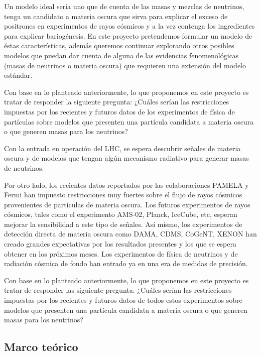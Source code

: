 Un modelo ideal sería uno que de cuenta de las masas y mezclas de
neutrinos, tenga un candidato a materia oscura que sirva para explicar
el exceso de positrones en experimentos de rayos cósmicos y a la vez
contenga los ingredientes para explicar bariogénesis.  En este
proyecto pretendemos formular un modelo de éstas características,
además queremos continuar explorando otros posibles modelos que puedan
dar cuenta de alguna de las evidencias fenomenológicas (masas de
neutrinos o materia oscura) que requieren una extensión del modelo
estándar.


\begin{proyecto}
  Con base en lo planteado anteriormente, lo que proponemos en este
  proyecto es tratar de responder la siguiente pregunta: ¿Cuáles
  serían las restricciones impuestas por los recientes y futuros datos
  de los experimentos de física de partículas sobre modelos que
  presenten una partícula candidata a materia oscura o que generen
  masas para los neutrinos?
\end{proyecto}
 
\begin{ideas}
  
Con la entrada en operación del LHC, se espera descubrir señales de materia oscura y de modelos que tengan algún mecanismo radiativo para generar masas de neutrinos.

Por otro lado, los recientes datos reportados por las colaboraciones PAMELA y Fermi han impuesto restricciones muy fuertes sobre el flujo de rayos cósmicos provenientes de partículas de materia oscura. Los futuros experimentos de rayos cósmicos, tales como el experimento AMS-02, Planck, IceCube, etc, esperan mejorar la sensibilidad a este tipo de señales. Así mismo, los experimentos de detección directa de materia oscura como DAMA, CDMS, CoGeNT, XENON han creado grandes expectativas por los resultados presentes y los que se espera obtener en los próximos meses. Los experimentos de física de neutrinos y de radiación cósmica de fondo han entrado ya en una era de medidas de precisión.

Con base en lo planteado anteriormente, lo que proponemos en este proyecto es tratar de responder las siguiente pregunta: ¿Cuáles serían las restricciones impuestas por los recientes y futuros datos de todos estos experimentos sobre  modelos que presenten una partícula candidata a materia oscura o que generen masas para los neutrinos?


\subsection{Marco teórico}
\end{ideas}

